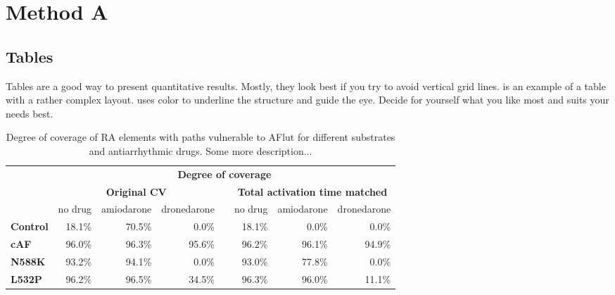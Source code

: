 \chapter{Method A}
\label{chap:methA}

\section{Tables}
\label{sec:meth:tables}
Tables are a good way to present quantitative results. Mostly, they look best if you try to avoid vertical grid lines.  is an example of a table with a rather complex layout.  uses color to underline the structure and guide the eye. Decide for yourself what you like most and suits your needs best.
\begin{table}[tb]
\caption{Degree of coverage of RA elements with paths vulnerable to AFlut for different substrates and antiarrhythmic drugs. Some more description...}
\begin{center}
\begin{tabular}{lrrrcrrr}\toprule
& \multicolumn{7}{c}{\textbf{Degree of coverage}}\\ \cmidrule{2-8}
& \multicolumn{3}{c}{\textbf{Original CV}} & &\multicolumn{3}{c}{\textbf{Total activation time matched}} \\ \cmidrule{2-4} \cmidrule{6-8}
& no drug & amiodarone & dronedarone & & no drug & amiodarone & dronedarone \\ \midrule
\textbf{Control} & 18.1\% & 70.5\% & 0.0\% & & 18.1\% & 0.0\% & 0.0\% \\
\textbf{cAF} & 96.0\% & 96.3\% & 95.6\% & & 96.2\% & 96.1\% & 94.9\% \\
\textbf{N588K} & 93.2\% & 94.1\% & 0.0\% & & 93.0\% & 77.8\% & 0.0\% \\
\textbf{L532P} & 96.2\% & 96.5\% & 34.5\% & & 96.3\% & 96.0\% & 11.1\% \\
\bottomrule
\end{tabular}
\end{center}
\label{tab:meth:coverage}
\end{table}

